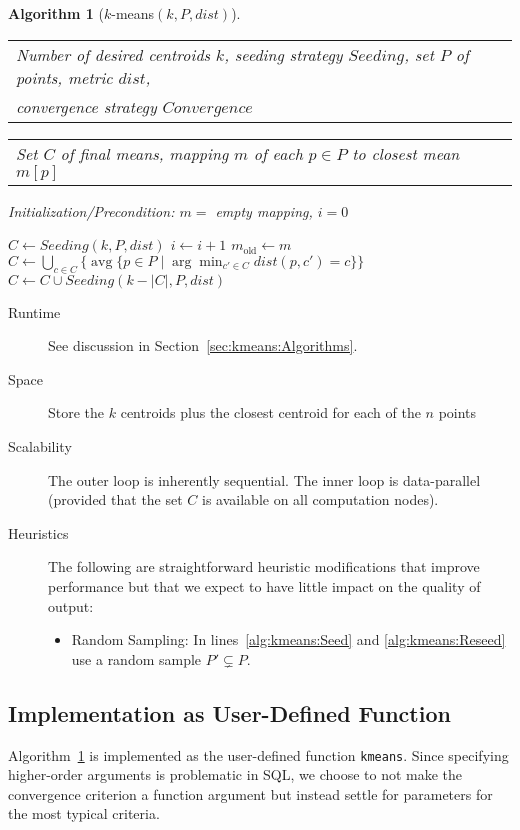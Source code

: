 \documentclass[letterpaper,11pt]{scrreprt}
\makeatletter
\numberwithin{equation}{section}
\def\internal@funcName#1$(#2)${#1}
\newcommand\funcName[1]{\internal@funcName #1}
\def\@currentlabel{\texttt{\funcName{##3}}}}
\newcommand{\symlabel}[2]{\def\@currentlabel{\texttt{#1}}\texttt{#1}\label{#2}}
\theoremstyle{algorithm}
\newtheorem{algorithm}{Algorithm}[section]
\newlength{\alglabelwidth}
\newcommand{\alginput}[1]{%
		\par\noindent%
		\settowidth{\alglabelwidth}{\emph{Output:}}%
		\makebox[\alglabelwidth][l]{\emph{Input:}} \begin{tabular}[t]{l} #1 \end{tabular}}
\newcommand{\algoutput}[1]{%
		\par\noindent%
		\settowidth{\alglabelwidth}{\emph{Output:}}%
		\makebox[\alglabelwidth][l]{\emph{Output:}} \begin{tabular}[t]{l} #1 \end{tabular}}
\newcommand{\algprecond}[1]{%
		\par\noindent\textit{Initialization/Precondition: #1}}
\newcommand{\set}{\leftarrow}
\newcommand{\dist}{\ensuremath{\mathit{dist}}}
\makeatother
\begin{document}
\begin{algorithm}[$k$-means$(k, P, \dist)$] \label{alg:kmeans}
\alginput{Number of desired centroids $k$, seeding strategy $\mathit{Seeding}$, set $P$ of points, metric $\dist$,\\convergence strategy $\mathit{Convergence}$}
\algoutput{Set $C$ of final means, mapping $m$ of each $p \in P$ to closest mean $m[p]$}
\algprecond{$m = $ empty mapping, $i = 0$}
\begin{algorithmic}[1]
	\State $C \set \mathit{Seeding}(k, P, \dist)$ \label{alg:kmeans:Seed}
	\Repeat
		\State $i \set i + 1$
		\State $m_\text{old} \set m$
		\State $C \set \bigcup_{c \in C} \{ \operatorname{avg} \{p \in P \mid \arg\min_{c' \in C} \dist(p, c') = c \} \}$ \label{alg:kmeans:MoveCentroids}
		\State $C \set C \cup \mathit{Seeding}(k - |C|, P, \dist)$ \label{alg:kmeans:Reseed}
	 \label{alg:kmeans:ConvergenceCond}
\end{algorithmic}
\end{algorithm}

\begin{description}
	\item[Runtime] See discussion in Section~\ref{sec:kmeans:Algorithms}.
	\item[Space] Store the $k$ centroids plus the closest centroid for each of the $n$ points
	\item[Scalability] The outer loop is inherently sequential. The inner loop is data-parallel (provided that the set $C$ is available on all computation nodes).
	\item[Heuristics] The following are straightforward heuristic modifications that improve performance but that we expect to have little impact on the quality of output:
		\begin{itemize}
			\item Random Sampling: In lines~\ref{alg:kmeans:Seed} and \ref{alg:kmeans:Reseed} use a random sample $P' \subsetneq P$.
		\end{itemize}
\end{description}

\subsection{Implementation as User-Defined Function}

Algorithm~\ref{alg:kmeans} is implemented as the user-defined function \symlabel{kmeans}{sym:kmeans}. Since specifying higher-order arguments is problematic in SQL, we choose to not make the convergence criterion a function argument but instead settle for parameters for the most typical criteria.
\end{document}
